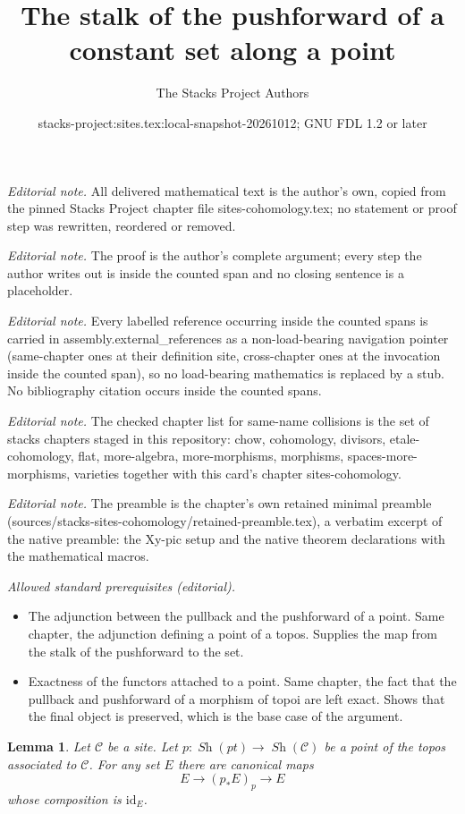 \documentclass[10pt,a4paper]{amsart}
\title{The stalk of the pushforward of a constant set along a point}
\author{The Stacks Project Authors}
\date{stacks-project:sites.tex:local-snapshot-20261012; GNU FDL 1.2 or later}
\theoremstyle{plain}
\newtheorem{lemma}[subsection]{Lemma}
\theoremstyle{definition}
\theoremstyle{remark}
\numberwithin{equation}{subsection}
\def\Sh{\mathop{\mathit{Sh}}\nolimits}
\begin{document}
\maketitle
\noindent\textit{Editorial note.} All delivered mathematical text is the author's own, copied from the pinned Stacks Project chapter file sites-cohomology.tex; no statement or proof step was rewritten, reordered or removed.\par\medskip
\noindent\textit{Editorial note.} The proof is the author's complete argument; every step the author writes out is inside the counted span and no closing sentence is a placeholder.\par\medskip
\noindent\textit{Editorial note.} Every labelled reference occurring inside the counted spans is carried in assembly.external\_references as a non-load-bearing navigation pointer (same-chapter ones at their definition site, cross-chapter ones at the invocation inside the counted span), so no load-bearing mathematics is replaced by a stub. No bibliography citation occurs inside the counted spans.\par\medskip
\noindent\textit{Editorial note.} The checked chapter list for same-name collisions is the set of stacks chapters staged in this repository: chow, cohomology, divisors, etale-cohomology, flat, more-algebra, more-morphisms, morphisms, spaces-more-morphisms, varieties together with this card's chapter sites-cohomology.\par\medskip
\noindent\textit{Editorial note.} The preamble is the chapter's own retained minimal preamble (sources/stacks-sites-cohomology/retained-preamble.tex), a verbatim excerpt of the native preamble: the Xy-pic setup and the native theorem declarations with the mathematical macros.\par\medskip
\noindent\textit{Allowed standard prerequisites (editorial).}\begin{itemize}
\item The adjunction between the pullback and the pushforward of a point. Same chapter, the adjunction defining a point of a topos. Supplies the map from the stalk of the pushforward to the set.
\item Exactness of the functors attached to a point. Same chapter, the fact that the pullback and pushforward of a morphism of topoi are left exact. Shows that the final object is preserved, which is the base case of the argument.
\end{itemize}\medskip
\begin{lemma}
\label{lemma-stalk-skyscraper}
Let $\mathcal{C}$ be a site. Let
$p : \Sh(pt) \to \Sh(\mathcal{C})$ be a point of
the topos associated to $\mathcal{C}$.
For any set $E$ there are canonical maps
$$
E \longrightarrow (p_*E)_p \longrightarrow E
$$
whose composition is $\text{id}_E$.
\end{lemma}
\end{document}
